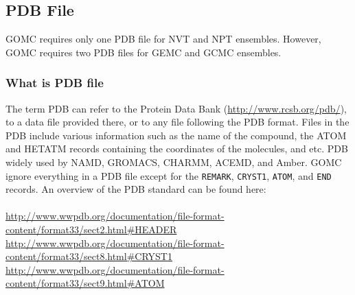\subsection{PDB File}
GOMC requires only one PDB file for NVT and NPT ensembles. However, GOMC requires two PDB files for GEMC and GCMC ensembles.
\subsubsection{What is PDB file}
The term PDB can refer to the Protein Data Bank (\url{http://www.rcsb.org/pdb/}), to a data file provided there, or to any file following the PDB format. Files in the PDB include various information such as the name of the compound, the ATOM and HETATM records containing the coordinates of the molecules, and etc. PDB widely used by NAMD, GROMACS, CHARMM, ACEMD, and Amber. GOMC ignore everything in a PDB file except for the \texttt{REMARK},  \texttt{CRYST1},  \texttt{ATOM}, and  \texttt{END} records. An overview of the PDB standard can be found here:\\\\
\url{http://www.wwpdb.org/documentation/file-format-content/format33/sect2.html#HEADER}\\
\url{http://www.wwpdb.org/documentation/file-format-content/format33/sect8.html#CRYST1}\\
\url{http://www.wwpdb.org/documentation/file-format-content/format33/sect9.html#ATOM}\\

